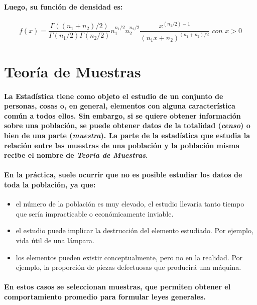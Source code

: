 \paragraph{
Luego, su función de densidad es:
}
\begin{equation}
f(x) = \frac{\Gamma((n_1+n_2)/2)}{\Gamma(n_1/2)\Gamma(n_2/2)}n_1^{n_1/2}n_2^{n_2/2}\frac{x^{(n_1/2)-1}}{(n_1 x+n_2)^{(n_1+n_2)/2}} \textit{ con } x>0
\end{equation}



\section{Teoría de Muestras}
\paragraph{
La Estadística tiene como objeto el estudio de un conjunto de personas, cosas o, en general, elementos con alguna característica común a todos ellos. Sin embargo, si se quiere obtener información sobre una población, se puede obtener datos de la totalidad (\emph{censo}) o bien de una parte (\emph{muestra}). La parte de la estadística que estudia la relación entre las muestras de una población y la población misma recibe el nombre de \emph{Teoría de Muestras}.
}
\paragraph{
En la práctica, suele ocurrir que no es posible estudiar los datos de toda la población, ya que:
}
\begin{itemize}
\item el número de la población es muy elevado, el estudio llevaría tanto tiempo que sería impracticable  o económicamente inviable.
\item el estudio puede implicar la destrucción del elemento estudiado. Por ejemplo, vida útil de una lámpara.
\item los elementos pueden existir conceptualmente, pero no en la realidad. Por ejemplo, la proporción de piezas defectuosas que producirá una máquina.
\end{itemize}
\paragraph{
En estos casos se seleccionan muestras, que permiten obtener el comportamiento promedio para formular leyes generales.
}
